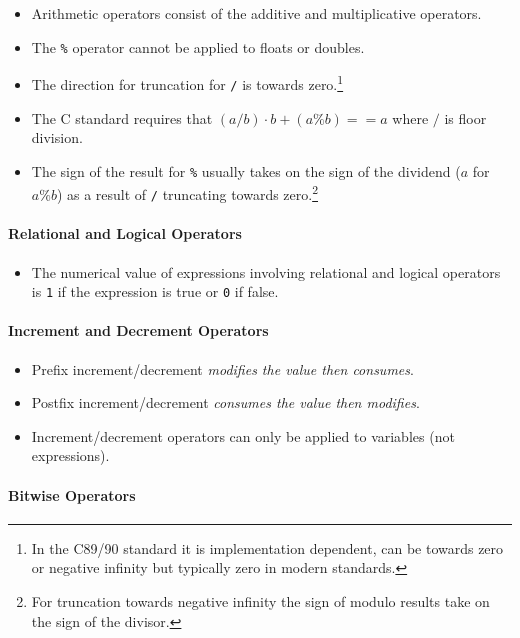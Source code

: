 \documentclass{article}
\newcommand{\code}[1]{\texttt{#1}}
\begin{document}
\begin{itemize}
    \item Arithmetic operators consist of the additive and multiplicative operators.
    \item The \code{\%} operator cannot be applied to floats or doubles.
    \item The direction for truncation for \code{/} is towards zero.\footnote{In the C89/90 standard it is implementation dependent, can be towards zero or negative infinity but typically zero in modern standards.}
    \item The C standard requires that $(a / b)\cdot b + (a \% b) == a$ where $/$ is floor division.
    \item The sign of the result for \code{\%} usually takes on the sign of the dividend ($a$ for $a \% b$) as a result of \code{/} truncating towards zero.\footnote{For truncation towards negative infinity the sign of modulo results take on the sign of the divisor.}
\end{itemize}

\paragraph{Relational and Logical Operators}

\begin{itemize}
    \item The numerical value of expressions involving relational and logical operators is \code{1} if the expression is true or \code{0} if false.
\end{itemize}

\paragraph{Increment and Decrement Operators}

\begin{itemize}
    \item Prefix increment/decrement \emph{modifies the value then consumes}.
    \item Postfix increment/decrement \emph{consumes the value then modifies}.
    \item Increment/decrement operators can only be applied to variables (not expressions).
\end{itemize}

\paragraph{Bitwise Operators}
\end{document}
